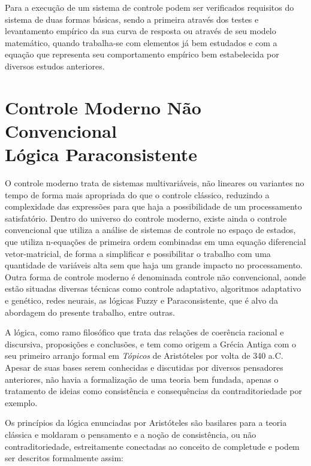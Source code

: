 Para a execução de um sistema de controle podem ser verificados requisitos do sistema de duas formas básicas, sendo a primeira através dos testes e levantamento empírico da sua curva de resposta ou através de seu modelo matemático, quando trabalha-se com elementos já bem estudados e com a equação que representa seu comportamento empírico bem estabelecida por diversos estudos anteriores.



\newpage



\section{Controle Moderno Não Convencional \\ Lógica Paraconsistente}

O controle moderno trata de sistemas multivariáveis, não lineares ou variantes no tempo de forma mais apropriada do que o controle clássico, reduzindo a complexidade das expressões para que haja a possibilidade de um processamento satisfatório.
Dentro do universo do controle moderno, existe ainda o controle convencional que utiliza a análise de sistemas de controle no espaço de estados, que utiliza n-equações de primeira ordem combinadas em uma equação diferencial vetor-matricial, de forma a simplificar e possibilitar o trabalho com uma quantidade de variáveis alta sem que haja um grande impacto no processamento.  \citep{Ogata} 
Outra forma de controle moderno é denominada controle não convencional, aonde estão situadas diversas técnicas como controle adaptativo, algoritmos adaptativo e genético, redes neurais, as lógicas Fuzzy e Paraconsistente, que é alvo da abordagem do presente trabalho, entre outras.

A lógica, como ramo filosófico que trata das relações de coerência racional e discursiva, proposições e conclusões, e tem como origem a Grécia Antiga com o seu primeiro arranjo formal em \emph{Tópicos} de Aristóteles por volta de 340 a.C. Apesar de suas bases serem conhecidas e discutidas por diversos pensadores anteriores, não havia a formalização de uma teoria bem fundada, apenas o tratamento de ideias como consistência e consequências da contraditoriedade por exemplo. 

Os princípios da lógica enunciadas por Aristóteles são basilares para a teoria clássica e moldaram o pensamento e a noção de consistência, ou não contraditoriedade, estreitamente conectadas ao conceito de completude e podem ser descritos formalmente assim:


